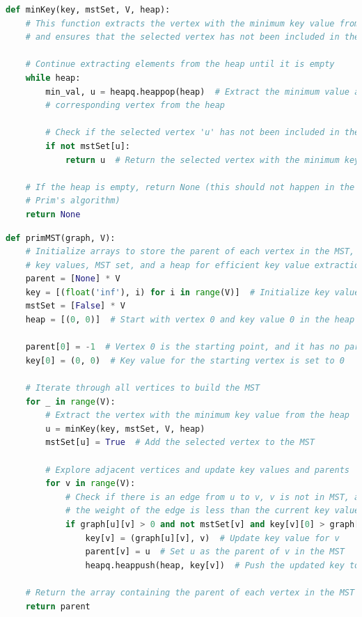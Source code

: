 \documentclass[a4paper, 10pt, twocolumn]{article}
\begin{document}
\newpage
\begin{lstlisting}[language=Python, caption={Python code to find minimum key using Heap}]
def minKey(key, mstSet, V, heap):
    # This function extracts the vertex with the minimum key value from the heap
    # and ensures that the selected vertex has not been included in the MST yet.

    # Continue extracting elements from the heap until it is empty
    while heap:
        min_val, u = heapq.heappop(heap)  # Extract the minimum value and 
        # corresponding vertex from the heap

        # Check if the selected vertex 'u' has not been included in the MST yet
        if not mstSet[u]:
            return u  # Return the selected vertex with the minimum key value

    # If the heap is empty, return None (this should not happen in the context of 
    # Prim's algorithm)
    return None
\end{lstlisting}
\begin{lstlisting}[language=Python, caption={Python code for Efficient Prim's Algorithm}]
def primMST(graph, V):
    # Initialize arrays to store the parent of each vertex in the MST,
    # key values, MST set, and a heap for efficient key value extraction
    parent = [None] * V
    key = [(float('inf'), i) for i in range(V)]  # Initialize key values to infinity
    mstSet = [False] * V
    heap = [(0, 0)]  # Start with vertex 0 and key value 0 in the heap

    parent[0] = -1  # Vertex 0 is the starting point, and it has no parent
    key[0] = (0, 0)  # Key value for the starting vertex is set to 0

    # Iterate through all vertices to build the MST
    for _ in range(V):
        # Extract the vertex with the minimum key value from the heap
        u = minKey(key, mstSet, V, heap)
        mstSet[u] = True  # Add the selected vertex to the MST

        # Explore adjacent vertices and update key values and parents
        for v in range(V):
            # Check if there is an edge from u to v, v is not in MST, and
            # the weight of the edge is less than the current key value for v
            if graph[u][v] > 0 and not mstSet[v] and key[v][0] > graph[u][v]:
                key[v] = (graph[u][v], v)  # Update key value for v
                parent[v] = u  # Set u as the parent of v in the MST
                heapq.heappush(heap, key[v])  # Push the updated key to the heap

    # Return the array containing the parent of each vertex in the MST
    return parent
\end{lstlisting}
\newpage
\end{document}
